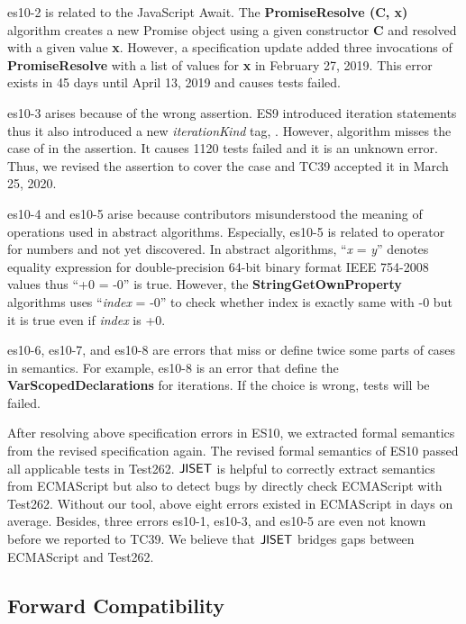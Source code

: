 es10-2 is related to the JavaScript Await.  The {\bf PromiseResolve (C, x)}
algorithm creates a new Promise object using a given constructor {\bf C} and
resolved with a given value {\bf x}.  However, a specification update added
three invocations of {\bf PromiseResolve} with a list of values for {\bf x} in
February 27, 2019.  This error exists in 45 days until April 13, 2019 and causes
 tests failed.

es10-3 arises because of the wrong assertion. ES9 introduced 
iteration statements thus it also introduced a new {\it iterationKind} tag,
. However,  algorithm misses
the case of  in the assertion. It causes 1120 tests failed
and it is an unknown error. Thus, we revised the assertion to cover the
 case and TC39 accepted it in March 25, 2020.

es10-4 and es10-5 arise because contributors misunderstood the meaning of
operations used in abstract algorithms. Especially, es10-5 is related to
\code{=} operator for numbers and not yet discovered. In abstract algorithms,
``{\it x} = {\it y}'' denotes equality expression for double-precision 64-bit
binary format IEEE 754-2008 values thus ``+0 = -0'' is true. However, the {\bf
StringGetOwnProperty} algorithms uses ``{\it index} = -0'' to check whether
index is exactly same with -0 but it is true even if {\it index} is +0.

es10-6, es10-7, and es10-8 are errors that miss or define twice some parts of
cases in semantics. For example, es10-8 is an error that define the {\bf
VarScopedDeclarations} for  iterations. If the choice is wrong,
 tests will be failed.

After resolving above specification errors in ES10, we extracted formal
semantics from the revised specification again. The revised formal semantics of
ES10 passed all  applicable tests in Test262.  \( \text{\sf JISET} \) is
helpful to correctly extract semantics from ECMAScript but also to detect bugs
by directly check ECMAScript with Test262. Without our tool, above eight errors
existed in ECMAScript in  days on average. Besides, three errors
es10-1, es10-3, and es10-5 are even not known before we reported to TC39. We
believe that \( \text{\sf JISET} \) bridges gaps between ECMAScript and Test262.


\subsection{Forward Compatibility}

